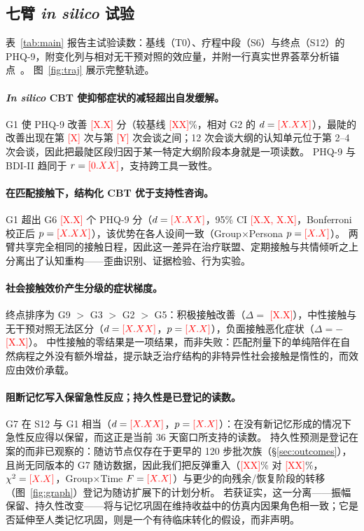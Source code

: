 \documentclass[11pt,a4paper]{article}
\newcommand{\ph}[1]{\textcolor{red}{[#1]}}
\begin{document}
\subsection{七臂 \emph{in silico} 试验}\label{sec:trial}

表~\ref{tab:main} 报告主试验读数：基线（T0）、疗程中段（S6）与终点（S12）的 PHQ-9，附变化列与相对无干预对照的效应量，并附一行真实世界荟萃分析锚点~\citep{cuijpers2013}。
图~\ref{fig:traj} 展示完整轨迹。

\paragraph{\emph{In silico} CBT 使抑郁症状的减轻超出自发缓解。}
G1 使 PHQ-9 改善 \ph{X.X} 分（较基线 \ph{XX}\%，相对 G2 的 $d = \ph{X.XX}$），最陡的改善出现在第 \ph{X} 次与第 \ph{Y} 次会谈之间；12 次会谈大纲的认知单元位于第 2--4 次会谈，因此把最陡区段归因于某一特定大纲阶段本身就是一项读数。
PHQ-9 与 BDI-II 趋同于 $r = \ph{0.XX}$，支持跨工具一致性。

\paragraph{在匹配接触下，结构化 CBT 优于支持性咨询。}
G1 超出 G6 \ph{X.X} 个 PHQ-9 分（$d = \ph{X.XX}$，95\% CI \ph{X.X, X.X}，Bonferroni 校正后 $p = \ph{X.XX}$），该优势在各人设间一致（Group$\times$Persona $p = \ph{X.X}$）。
两臂共享完全相同的接触日程，因此这一差异在治疗联盟、定期接触与共情倾听之上分离出了认知重构——歪曲识别、证据检验、行为实验。

\paragraph{社会接触效价产生分级的症状梯度。}
终点排序为 G9 $>$ G3 $>$ G2 $>$ G5：积极接触改善（$\Delta = $ \ph{X.X}），中性接触与无干预对照无法区分（$d = \ph{X.XX}$，$p = \ph{X.X}$），负面接触恶化症状（$\Delta = -$\ph{X.X}）。
中性接触的零结果是一项结果，而非失败：匹配剂量下的单纯陪伴在自然病程之外没有额外增益，提示缺乏治疗结构的非特异性社会接触是惰性的，而效应由效价承载。

\paragraph{阻断记忆写入保留急性反应；持久性是已登记的读数。}
G7 在 S12 与 G1 相当（$d = \ph{X.XX}$，$p = \ph{X.X}$）：在没有新记忆形成的情况下急性反应得以保留，而这正是当前 36 天窗口所支持的读数。
持久性预测是登记在案的而非已观察的：随访节点仅存在于更早的 120 步批次族（\S\ref{sec:outcomes}），且尚无同版本的 G7 随访数据，因此我们把反弹重入（\ph{XX}\% 对 \ph{XX}\%，$\chi^2 = \ph{X.X}$，Group$\times$Time $F = \ph{X.X}$）与更少的向残余/恢复阶段的转移（图~\ref{fig:graph}）登记为随访扩展下的计划分析。
若获证实，这一分离——振幅保留、持久性改变——将与记忆巩固在维持收益中的仿真内因果角色相一致；它是否延伸至人类记忆巩固，则是一个有待临床转化的假设，而非声明。
\end{document}
